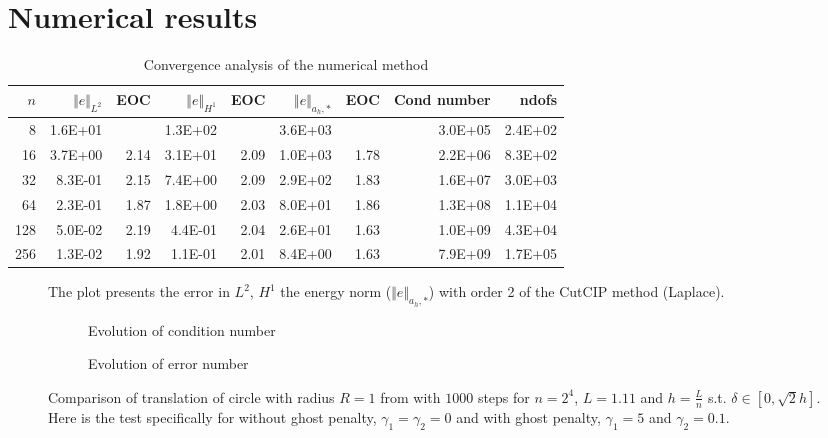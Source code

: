 
\newpage
\section{Numerical results}%
\label{sec:numerical_results}


\begin{table}[h!]
    \caption{Convergence analysis of the numerical method}
    \label{table:CutFEM_error1}
  \begin{tabular}{rrrrrrrrr}
    \hline\hline
    \textbf{$n$} & \textbf{$\Vert e \Vert_{L^2}$} & \textbf{EOC} & \textbf{$ \Vert e \Vert_{H^1}$} & \textbf{EOC} & \textbf{$\Vert e \Vert_{ a_h,* }$} & \textbf{EOC} & \textbf{Cond number} & \textbf{ndofs} \\\hline
    8 & 1.6E+01 &  & 1.3E+02 &  & 3.6E+03 &  & 3.0E+05 & 2.4E+02 \\
    16 & 3.7E+00 & 2.14 & 3.1E+01 & 2.09 & 1.0E+03 & 1.78 & 2.2E+06 & 8.3E+02 \\
    32 & 8.3E-01 & 2.15 & 7.4E+00 & 2.09 & 2.9E+02 & 1.83 & 1.6E+07 & 3.0E+03 \\
    64 & 2.3E-01 & 1.87 & 1.8E+00 & 2.03 & 8.0E+01 & 1.86 & 1.3E+08 & 1.1E+04 \\
    128 & 5.0E-02 & 2.19 & 4.4E-01 & 2.04 & 2.6E+01 & 1.63 & 1.0E+09 & 4.3E+04 \\
    256 & 1.3E-02 & 1.92 & 1.1E-01 & 2.01 & 8.4E+00 & 1.63 & 7.9E+09 & 1.7E+05 \\\hline\hline
  \end{tabular}

\end{table}

\begin{figure}[h!]
    \centering
    
    \caption{The plot presents the error in $L^2$, $H^1$ the energy norm ($\Vert e \Vert_{a_h,*}$) with order 2 of the CutCIP method (Laplace).}
    \label{fig:CutFEM_error1}
\end{figure}

\begin{figure}[h!]
    \centering
    \begin{subfigure}{\textwidth}
        \centering
        
        \caption{Evolution of condition number}
        \label{subfig:cond}
    \end{subfigure}
    \hfill
    \begin{subfigure}{\textwidth}
        \centering
        
        \caption{Evolution of error number}
        \label{subfig:error}
    \end{subfigure}
    \caption{Comparison of translation of circle with radius $R=1$ from with $1000$ steps for $n=2^4$, $L=1.11$ and $h=\frac{L}{n}$ s.t. $\delta \in  [0, \sqrt{2} h]  $. Here is the test specifically for without ghost penalty, $\gamma _{1} =
    \gamma_2=0 $ and with ghost penalty, $ \gamma _{1} = 5 $ and $\gamma _{2} = 0.1$.}

    \label{fig:combined}
\end{figure}




